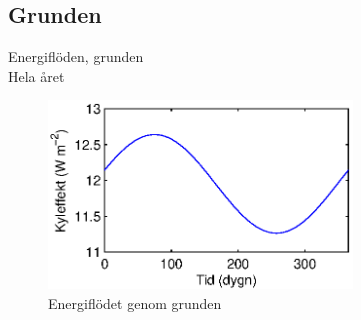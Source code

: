\subsection{Grunden}

\begin{frame}{Energiflöden, grunden\\Hela året}

\begin{figure}[hpbt]
\centering
\includegraphics[height=5cm]{images/foundation.eps}
\caption*{Energiflödet genom grunden}
\end{figure}

\end{frame}